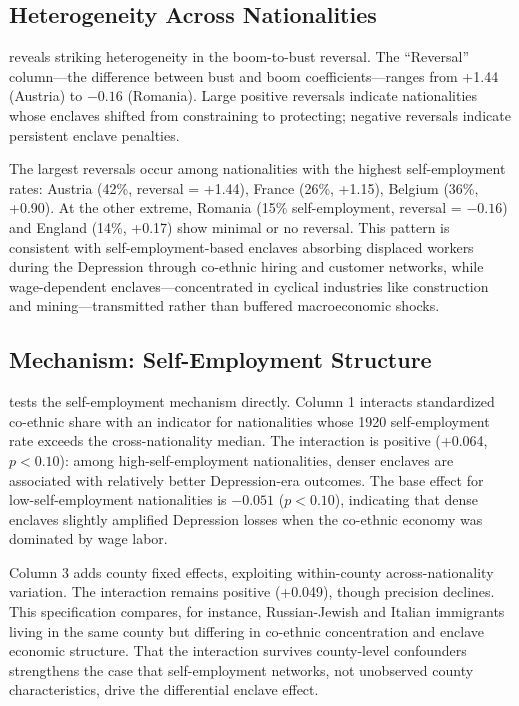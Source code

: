 \documentclass[12pt]{article}
\begin{document}
{\small}

\subsection{Heterogeneity Across Nationalities}

 reveals striking heterogeneity in the boom-to-bust reversal. The ``Reversal'' column---the difference between bust and boom coefficients---ranges from +1.44 (Austria) to $-0.16$ (Romania). Large positive reversals indicate nationalities whose enclaves shifted from constraining to protecting; negative reversals indicate persistent enclave penalties.

The largest reversals occur among nationalities with the highest self-employment rates: Austria (42\%, reversal = +1.44), France (26\%, +1.15), Belgium (36\%, +0.90). At the other extreme, Romania (15\% self-employment, reversal = $-0.16$) and England (14\%, +0.17) show minimal or no reversal. This pattern is consistent with self-employment-based enclaves absorbing displaced workers during the Depression through co-ethnic hiring and customer networks, while wage-dependent enclaves---concentrated in cyclical industries like construction and mining---transmitted rather than buffered macroeconomic shocks.



\subsection{Mechanism: Self-Employment Structure}

 tests the self-employment mechanism directly. Column 1 interacts standardized co-ethnic share with an indicator for nationalities whose 1920 self-employment rate exceeds the cross-nationality median. The interaction is positive (+0.064, $p < 0.10$): among high-self-employment nationalities, denser enclaves are associated with relatively better Depression-era outcomes. The base effect for low-self-employment nationalities is $-0.051$ ($p < 0.10$), indicating that dense enclaves slightly amplified Depression losses when the co-ethnic economy was dominated by wage labor.

Column 3 adds county fixed effects, exploiting within-county across-nationality variation. The interaction remains positive (+0.049), though precision declines. This specification compares, for instance, Russian-Jewish and Italian immigrants living in the same county but differing in co-ethnic concentration and enclave economic structure. That the interaction survives county-level confounders strengthens the case that self-employment networks, not unobserved county characteristics, drive the differential enclave effect.
\end{document}
